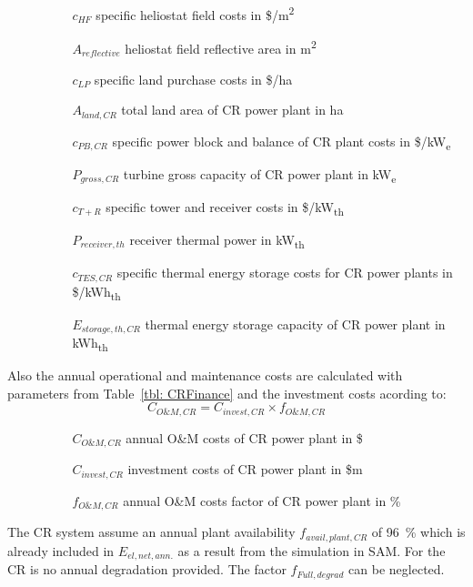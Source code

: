 \documentclass[Master,MEE,english]{twbook}%
\begin{document}
\begin{itemize}
\item[ ] 
\begin{itemize}
\item[ ] 
\begin{itemize}
\item[$c_{HF}$]specific heliostat field costs in \$/m\textsuperscript{2}
\item[$A_{reflective}$]heliostat field reflective area in m\textsuperscript{2}
\item[$c_{LP}$]specific land purchase costs in \$/ha
\item[$A_{land,CR}$]total land area of CR power plant in ha
\item[$c_{PB,CR}$]specific power block and balance of CR plant costs in \$/kW\textsubscript{e}
\item[$P_{gross,CR}$]turbine gross capacity of CR power plant in kW\textsubscript{e}
\item[$c_{T+R}$]specific tower and receiver costs in \$/kW\textsubscript{th}
\item[$P_{receiver,th}$]receiver thermal power in kW\textsubscript{th}
\item[$c_{TES,CR}$]specific thermal energy storage costs for CR power plants in \$/kWh\textsubscript{th}
\item[$E_{storage,th,CR}$]thermal energy storage capacity of CR power plant in kWh\textsubscript{th}
\end{itemize}
\end{itemize}
\end{itemize}
Also the annual operational and maintenance costs are calculated with parameters from Table~\ref{tbl: CRFinance} and the investment costs acording to:
\begin{equation}
C_{O\&M,CR} = C_{invest,CR} \times f_{O\&M,CR}
\end{equation} 
\begin{itemize}
\item[ ] 
\begin{itemize}
\item[ ] 
\begin{itemize}
\item[$C_{O\&M,CR}$]annual O\&M costs of CR power plant in \$
\item[$C_{invest,CR}$]investment costs of CR power plant in \$m
\item[$f_{O\&M,CR}$]annual O\&M costs factor of CR power plant in \%
\end{itemize}
\end{itemize}
\end{itemize}
The CR system assume an annual plant availability $f_{avail,plant,CR}$ of 96~\% which is already included in $E_{el,net,ann.}$ as a result from the simulation in SAM. For the CR is no annual degradation provided. The factor $f_{Full,degrad}$ can be neglected.
\end{document}

